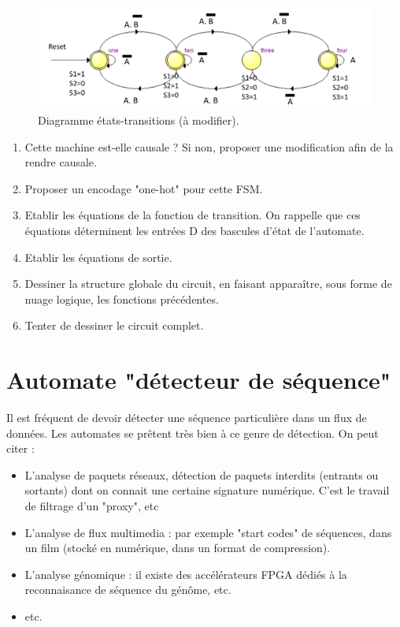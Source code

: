 \documentclass[a4paper,11pt]{article}
\begin{document}
\begin{figure}[!h]
  \begin{center}
    \includegraphics[scale=0.25]{./figures/exo1}
  \end{center}
  \caption{Diagramme états-transitions (à modifier).}
  \label{exo1}
\end{figure}

\begin{enumerate}
  \item Cette machine est-elle causale ? Si non, proposer une modification afin de la rendre causale.
  \item Proposer un encodage "one-hot" pour cette FSM.
  \item Etablir les équations de la fonction de transition. On rappelle que ces équations déterminent les entrées D des bascules d'état de l'automate.
  \item Etablir les équations de sortie.
  \item Dessiner la structure globale du circuit, en faisant apparaître, sous forme de nuage logique, les fonctions précédentes.
  \item Tenter de dessiner le circuit complet.
\end{enumerate}

\section{Automate "détecteur de séquence"}

Il est fréquent de devoir détecter une séquence particulière dans un flux de données.
Les automates se prêtent très bien à ce genre de détection. On peut citer :
\begin{itemize}
  \item L'analyse de paquets réseaux, détection de paquets interdits (entrants ou sortants) dont on connait une certaine signature numérique. C'est le travail de filtrage d'un "proxy", etc
  \item L'analyse de flux multimedia : par exemple "start codes" de séquences, dans un film (stocké en numérique, dans un format de compression).
  \item L'analyse génomique : il existe des accélérateurs FPGA dédiés à la reconnaisance de séquence du génôme, etc.
  \item etc.
\end{itemize}
\end{document}
